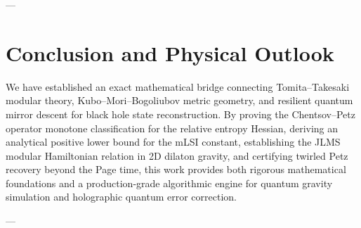 \documentclass[11pt,a4paper]{article}
\theoremstyle{plain}
\theoremstyle{definition}
\begin{document}
---

\section{Conclusion and Physical Outlook}
We have established an exact mathematical bridge connecting Tomita--Takesaki modular theory, Kubo--Mori--Bogoliubov metric geometry, and resilient quantum mirror descent for black hole state reconstruction. By proving the Chentsov--Petz operator monotone classification for the relative entropy Hessian, deriving an analytical positive lower bound for the mLSI constant, establishing the JLMS modular Hamiltonian relation in 2D dilaton gravity, and certifying twirled Petz recovery beyond the Page time, this work provides both rigorous mathematical foundations and a production-grade algorithmic engine for quantum gravity simulation and holographic quantum error correction.

---
\end{document}
